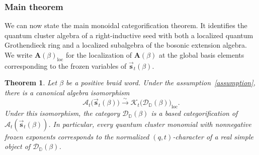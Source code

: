 \documentclass[12pt, reqno]{amsart}
\theoremstyle{plain}
\newtheorem{theorem}{Theorem}[section]
\theoremstyle{definition}
\numberwithin{equation}{section}
\newcommand{\DD}{\mathbb{D}}
\begin{document}
\subsubsection{Main theorem}
We can now state the main monoidal categorification theorem. It
identifies the quantum cluster algebra of a right-inductive seed with
both a localized quantum Grothendieck ring and a localized subalgebra
of the bosonic extension algebra. We write
\(\mathbf A(\beta)_{\mathrm{loc}}\) for the localization of
\(\mathbf A(\beta)\) at the global basis elements corresponding to the
frozen variables of \(\overrightarrow{\mathbf s}_t(\beta)\).

\begin{theorem}\label{thm:main-monoidal-categorification}
Let \(\beta\) be a positive braid word. Under the assumption~\ref{assumption}, there is a canonical algebra isomorphism
\begin{equation}\label{eq:isoAt}
    \mathcal A_t\bigl(\overrightarrow{\mathbf s}_t(\beta)\bigr)
    \xrightarrow{\ \sim\ }
    \mathcal{K}_t\bigl(\mathscr D_{\DD}(\beta)\bigr)_{\mathrm{loc}}.
\end{equation}
Under this isomorphism, the category \(\mathscr D_\DD(\beta)\) is a
based categorification of
\(\mathcal A_t(\overrightarrow{\mathbf s}_t(\beta))\). In particular,
every quantum cluster monomial with nonnegative
frozen exponents corresponds to the normalized \((q,t)\)-character of a
real simple object of \(\mathscr D_{\DD}(\beta)\). 
\end{theorem}
\end{document}
